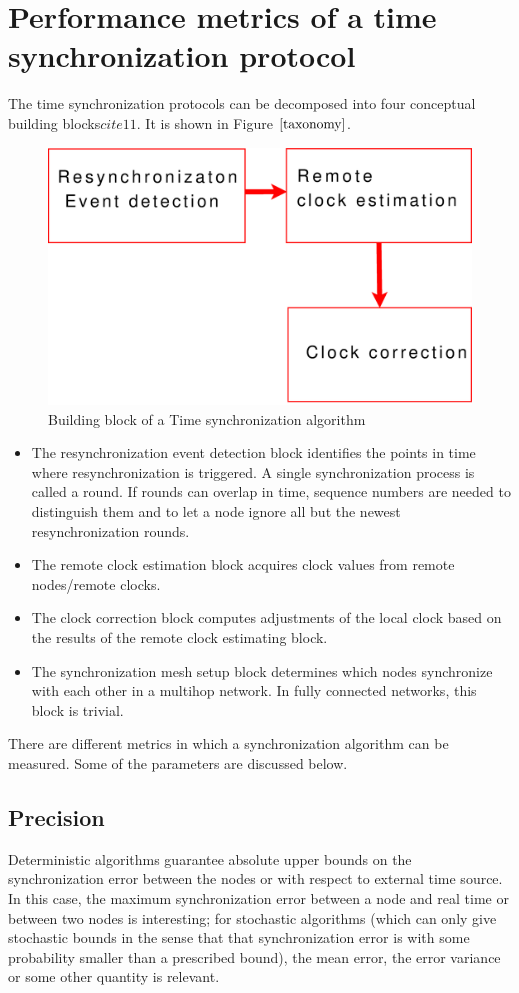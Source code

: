 \documentclass[a4paper,10pt]{report}
\begin{document}
\section{\textbf{Performance metrics of a time synchronization protocol}}
The time synchronization protocols can be decomposed into four
conceptual building blocks$cite{11}$. It is shown in Figure
$\cite{taxonomy}$.
\begin{figure}
 \centering
\includegraphics[width=0.5 \textwidth]{buildingblock}
\caption{Building block of a Time synchronization algorithm}
\label{block}
\end{figure}
\begin{itemize}
\item The resynchronization event detection block identifies the points in time where resynchronization is triggered. A single synchronization process is called a round. If rounds can overlap in time, sequence numbers are needed to distinguish them and to let a node ignore all but the newest resynchronization rounds.
\item The remote clock estimation block acquires clock values from remote nodes/remote clocks.
\item The clock correction block computes adjustments of the local clock based on the results of the remote clock estimating block.
\item The synchronization mesh setup block determines which nodes synchronize with each other in a multihop network. In fully connected networks, this block is trivial.
\end{itemize}
There are different metrics in which a synchronization algorithm can be measured.
Some of the parameters are discussed below.
\subsection{\textbf{Precision}}
Deterministic algorithms guarantee absolute upper bounds on the synchronization error between the nodes or with
respect to external time source. In this case, the maximum synchronization error between a node and real time or between
two nodes is interesting; for stochastic algorithms (which can only give stochastic bounds in the sense that that synchronization
error is with some probability smaller than a prescribed bound), the mean error, the error variance or some other quantity is relevant.
\end{document}
